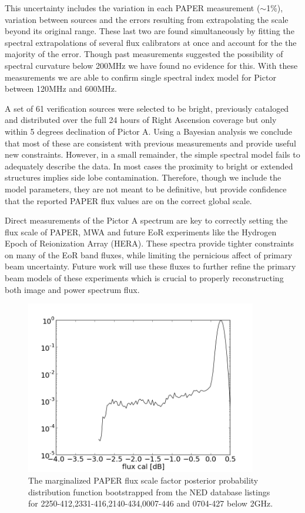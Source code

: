 \documentclass[preprint]{aastex}
\begin{document}
This uncertainty includes the 
variation in each PAPER measurement ($\sim$1\%), variation between sources and the errors resulting
from extrapolating the \citet{Baars:1977p9678} scale beyond its original range. These last
two are found simultaneously by fitting the spectral extrapolations of several flux calibrators
at once and account for the the majority of the error. Though past measurements suggested the possibility
of spectral curvature below 200MHz we have found no evidence for this.  With these measurements we are able 
to confirm single spectral index model for Pictor between 120MHz and 600MHz.

A set of  61 verification sources were selected to be bright, previously cataloged
and  distributed over
the full 24 hours of Right Ascension coverage but only within 5 degrees
declination of Pictor A.  Using a Bayesian analysis we conclude that most of
these are consistent with previous measurements and provide useful new
constraints. However, in a small remainder, the simple spectral model fails to
adequately describe the data. In most cases the proximity to bright or extended
structures implies side lobe contamination.  Therefore, though we include the
model parameters, they are not meant to be definitive, but provide confidence
that the reported PAPER flux values are on the correct global scale.


Direct measurements of the Pictor A spectrum are key to correctly setting the
flux scale of PAPER, MWA and future EoR experiments like the Hydrogen Epoch of Reionization Array (HERA).
These spectra provide tighter constraints on many of the EoR band fluxes, while
limiting the pernicious affect of primary beam uncertainty.  Future work will use these
fluxes to further  refine the primary beam models of these experiments which is crucial to properly reconstructing
both image and power spectrum flux.


\begin{figure}
\centering
\includegraphics[width=0.9\textwidth]{plots/1526-423_2250-412_2331-416_1932-464_1421-490_gain_mcmc_chain_gain_conf.png}
\caption{
The marginalized PAPER flux scale factor posterior probability distribution
function bootstrapped from the NED database listings for
2250-412,2331-416,2140-434,0007-446 and 0704-427 below 2GHz.
\label{fig:gain}}
\end{figure}
\end{document}
